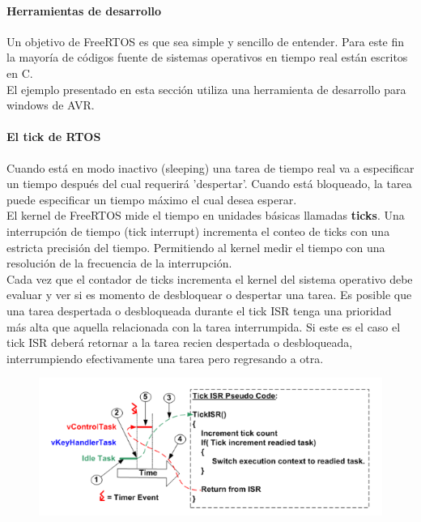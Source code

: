 \paragraph{Herramientas de desarrollo}

Un objetivo de FreeRTOS es que sea simple y sencillo de entender. Para este fin la mayoría de códigos fuente de sistemas operativos en tiempo real están escritos en C. \\

El ejemplo presentado en esta sección utiliza una herramienta de desarrollo para windows de AVR.

\paragraph{El tick de RTOS}

Cuando está en modo inactivo (sleeping) una tarea de tiempo real va a especificar un tiempo después del cual requerirá 'despertar'. Cuando está bloqueado, la tarea puede especificar un tiempo máximo el cual desea esperar.\\

El kernel de FreeRTOS mide el tiempo en unidades básicas llamadas \textbf{ticks}. Una interrupción de tiempo (tick interrupt) incrementa el conteo de ticks con una estricta precisión del tiempo. Permitiendo al kernel medir el tiempo con una resolución de la frecuencia de la interrupción. \\

Cada vez que el contador de ticks incrementa el kernel del sistema operativo debe evaluar y ver si es momento de desbloquear o despertar una tarea. Es posible que una tarea despertada o desbloqueada durante el tick ISR tenga una prioridad más alta que aquella relacionada con la tarea interrumpida. Si este es el caso el tick ISR deberá retornar a la tarea recien despertada o desbloqueada, interrumpiendo efectivamente una tarea pero regresando a otra.


\begin{figure}[H]
    \centering
    \includegraphics[scale=1]{RTOS/f4.PNG}
\end{figure}

